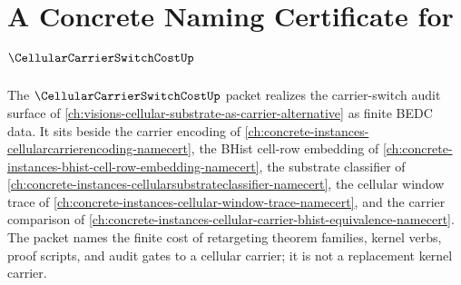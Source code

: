 \chapter{A Concrete Naming Certificate for $\CellularCarrierSwitchCostUp$}
\label{ch:concrete-instances-cellular-carrier-switch-cost-namecert}

The $\CellularCarrierSwitchCostUp$ packet realizes the carrier-switch audit surface of \autoref{ch:visions-cellular-substrate-as-carrier-alternative} as finite BEDC data. It sits beside the carrier encoding of \autoref{ch:concrete-instances-cellularcarrierencoding-namecert}, the BHist cell-row embedding of \autoref{ch:concrete-instances-bhist-cell-row-embedding-namecert}, the substrate classifier of \autoref{ch:concrete-instances-cellularsubstrateclassifier-namecert}, the cellular window trace of \autoref{ch:concrete-instances-cellular-window-trace-namecert}, and the carrier comparison of \autoref{ch:concrete-instances-cellular-carrier-bhist-equivalence-namecert}. The packet names the finite cost of retargeting theorem families, kernel verbs, proof scripts, and audit gates to a cellular carrier; it is not a replacement kernel carrier.

